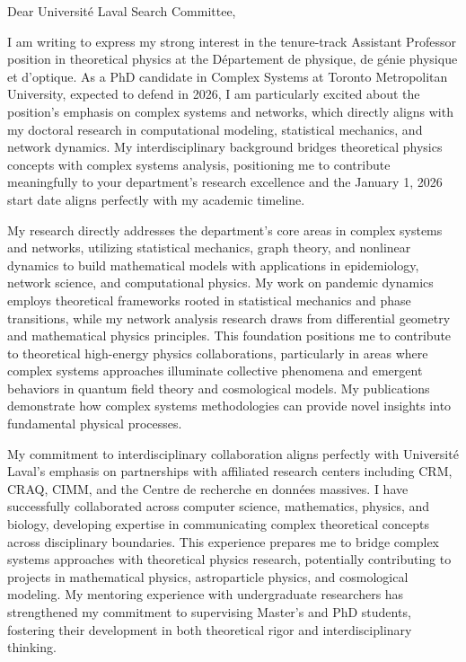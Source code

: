 Dear Université Laval Search Committee,
\vspace{1.0em}

\hspace{1.5em} I am writing to express my strong interest in the tenure-track Assistant Professor position in theoretical physics at the Département de physique, de génie physique et d'optique. As a PhD candidate in Complex Systems at Toronto Metropolitan University, expected to defend in 2026, I am particularly excited about the position's emphasis on complex systems and networks, which directly aligns with my doctoral research in computational modeling, statistical mechanics, and network dynamics. My interdisciplinary background bridges theoretical physics concepts with complex systems analysis, positioning me to contribute meaningfully to your department's research excellence and the January 1, 2026 start date aligns perfectly with my academic timeline.
\vspace{1.0em}

\hspace{1.5em} My research directly addresses the department's core areas in complex systems and networks, utilizing statistical mechanics, graph theory, and nonlinear dynamics to build mathematical models with applications in epidemiology, network science, and computational physics. My work on pandemic dynamics employs theoretical frameworks rooted in statistical mechanics and phase transitions, while my network analysis research draws from differential geometry and mathematical physics principles. This foundation positions me to contribute to theoretical high-energy physics collaborations, particularly in areas where complex systems approaches illuminate collective phenomena and emergent behaviors in quantum field theory and cosmological models. My publications demonstrate how complex systems methodologies can provide novel insights into fundamental physical processes.
\vspace{1.0em}

\hspace{1.5em} My commitment to interdisciplinary collaboration aligns perfectly with Université Laval's emphasis on partnerships with affiliated research centers including CRM, CRAQ, CIMM, and the Centre de recherche en données massives. I have successfully collaborated across computer science, mathematics, physics, and biology, developing expertise in communicating complex theoretical concepts across disciplinary boundaries. This experience prepares me to bridge complex systems approaches with theoretical physics research, potentially contributing to projects in mathematical physics, astroparticle physics, and cosmological modeling. My mentoring experience with undergraduate researchers has strengthened my commitment to supervising Master's and PhD students, fostering their development in both theoretical rigor and interdisciplinary thinking.
\vspace{1.0em}


